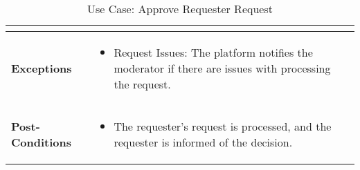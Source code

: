 \begin{table}[!ht]
\begin{tabularx}{\textwidth}{|l|X|}
\begin{itemize}[label=--,itemsep=0pt]
        \end{itemize} \\
        \hline
        \textbf{Exceptions} & 
        \begin{itemize}[label=--,itemsep=0pt]
            \item Request Issues: The platform notifies the moderator if there are issues with processing the request.
        \end{itemize} \\
        \hline
        \textbf{Post-Conditions} & 
        \begin{itemize}[label=--,itemsep=0pt]
            \item The requester’s request is processed, and the requester is informed of the decision.
        \end{itemize} \\
        \hline
    \end{tabularx}
    \caption{Use Case: Approve Requester Request}
    \label{tab:use-case-approve-requester-request}
\end{table}


